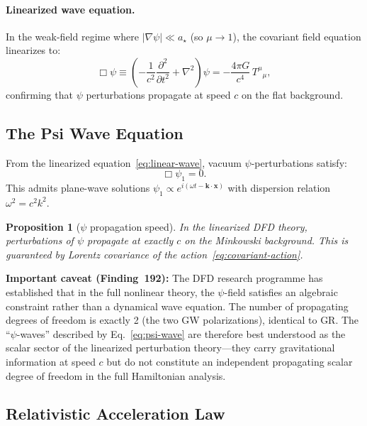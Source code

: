 \documentclass[aps,prd,twocolumn,superscriptaddress,nofootinbib]{revtex4-2}
\newtheorem{proposition}{Proposition}
\newcommand{\xvec}{\mathbf{x}}
\newcommand{\kvec}{\mathbf{k}}
\begin{document}
\paragraph{Linearized wave equation.} In the weak-field regime where
$|\nabla\psi| \ll a_\star$ (so $\mu \to 1$), the covariant field
equation linearizes to:
\begin{equation}\label{eq:linear-wave}
\Box\psi \equiv \left(-\frac{1}{c^2}\frac{\partial^2}{\partial t^2}
+ \nabla^2\right)\psi = -\frac{4\pi G}{c^4}\,T^\mu{}_\mu,
\end{equation}
confirming that $\psi$ perturbations propagate at speed $c$ on
the flat background.

\subsection{The Psi Wave Equation}

From the linearized equation~\eqref{eq:linear-wave}, vacuum
$\psi$-perturbations satisfy:
\begin{equation}\label{eq:psi-wave}
\Box\psi_1 = 0.
\end{equation}
This admits plane-wave solutions $\psi_1 \propto e^{i(\omega t -
\kvec\cdot\xvec)}$ with dispersion relation $\omega^2 = c^2 k^2$.

\begin{proposition}[$\psi$ propagation speed]
\label{prop:psi-speed}
In the linearized DFD theory, perturbations of $\psi$ propagate at
exactly $c$ on the Minkowski background.  This is guaranteed by
Lorentz covariance of the action~\eqref{eq:covariant-action}.
\end{proposition}

\textbf{Important caveat (Finding~192):} The DFD research programme
has established that in the full nonlinear theory, the $\psi$-field
satisfies an algebraic constraint rather than a dynamical wave
equation.  The number of propagating degrees of freedom is exactly 2
(the two GW polarizations), identical to GR.  The ``$\psi$-waves''
described by Eq.~\eqref{eq:psi-wave} are therefore best understood as
the scalar sector of the linearized perturbation theory---they carry
gravitational information at speed $c$ but do not constitute an
independent propagating scalar degree of freedom in the full
Hamiltonian analysis.

\subsection{Relativistic Acceleration Law}
\end{document}
